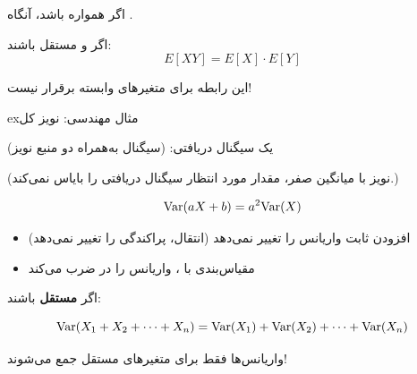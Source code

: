 اگر همواره  باشد، آنگاه .


اگر  و  مستقل باشند:\PSbr{}\[E[XY] = E[X] \cdot E[Y]\]

\begin{PSquote}

\lr{\PSwarn{}} این رابطه برای متغیرهای وابسته برقرار نیست!

\end{PSquote}

\begin{PSbox}[unbreakable]{ex}{مثال مهندسی: نویز کل}

یک سیگنال دریافتی:  (سیگنال به‌همراه دو منبع نویز)


(نویز با میانگین صفر، مقدار مورد انتظار سیگنال دریافتی را بایاس نمی‌کند.)

\end{PSbox}



\[\text{Var}(aX + b) = a^2 \text{Var}(X)\]

\begin{itemize}
\tightlist
\item
  افزودن ثابت  واریانس را تغییر نمی‌دهد (انتقال، پراکندگی را تغییر نمی‌دهد)
\item
  مقیاس‌بندی با ، واریانس را در  ضرب می‌کند
\end{itemize}


اگر  \textbf{مستقل} باشند:

\[\text{Var}(X_1 + X_2 + \cdots + X_n) = \text{Var}(X_1) + \text{Var}(X_2) + \cdots + \text{Var}(X_n)\]

\begin{PSquote}

\lr{\PSwarn{}} واریانس‌ها فقط برای متغیرهای مستقل جمع می‌شوند!

\end{PSquote}

